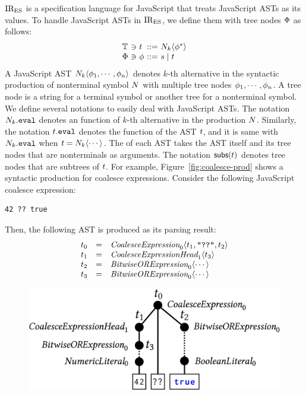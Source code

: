\documentclass[10pt,conference]{IEEEtran}
\begin{document}
$\text{IR}_\text{ES}$ is a specification language for JavaScript that treats JavaScript ASTs
as its values. To handle JavaScript ASTs in $\text{IR}_\text{ES}$, we define them with tree
nodes $\Phi$ as follows:
\[
  \begin{array}{l@{~}c@{~}l@{~}c@{~}l}
    \treeset &\ni& \tree &::=& \nt_k \langle \node^* \rangle\\
    \nodeset &\ni& \node &::=& \str \mid \tree\\
  \end{array}
\]
A JavaScript AST $N_k \langle \phi_1, \cdots, \phi_n \rangle$ denotes $k$-th
alternative in the syntactic production of nonterminal symbol $N$ with
multiple tree nodes $\phi_1, \cdots, \phi_n$.  A tree node is a string for a
terminal symbol or another tree for a nonterminal symbol. We define several
notations to easily deal with JavaScript ASTs.  The notation $\nt_k.\eval$ denotes
an  function of $k$-th alternative in the production $N$.
Similarly, the notation $\tree.\eval$ denotes the  function of
the AST $t$, and it is same with $\nt_k.\eval$ when $t = N_k \langle
\cdots \rangle$. The  of each AST takes the AST itself and its
tree nodes that are nonterminals as arguments.  The notation $\getsubs(\tree)$
denotes tree nodes that are subtrees of $t$.  For example,
Figure~\ref{fig:coalesce-prod} shows a syntactic production for coalesce
expressions.  Consider the following JavaScript coalesce expression:
\begin{lstlisting}[style=JS]
                    42 ?? true
\end{lstlisting}
Then, the following AST is produced as its parsing result:
\[
  \begin{array}{lcl}
    \tree_0 &=&
    \essyn{CoalesceExpression}_0 \langle \tree_1, \code{"??"}, \tree_2 \rangle\\

    \tree_1 &=&
    \essyn{CoalesceExpressionHead}_1 \langle \tree_3 \rangle\\

    \tree_2 &=&
    \essyn{BitwiseORExpression}_0 \langle \cdots \rangle\\

    \tree_3 &=&
    \essyn{BitwiseORExpression}_0 \langle \cdots \rangle\\
  \end{array}
\]
\begin{figure}[H]
  \includegraphics[width=.8\columnwidth]{img/ast-example.png}
\end{figure}
\end{document}
